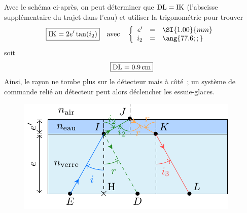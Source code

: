 \documentclass[../../main/main.tex]{subfiles}
\begin{document}
{\begin{enumerate}
		      Avec le schéma ci-après, on peut déterminer que $\rm DL = IK$
		      (l'abscisse supplémentaire du trajet dans l'eau) et utiliser la
		      trigonométrie pour trouver
		      \[
			      \boxed{{\rm IK} = 2e'\tan(i_2)}
			      \quad\text{avec}\quad
			      \left\{
			      \begin{array}{rcl}
				      e'  & = & \SI{1.00}{mm} \\
				      i_2 & = & \ang{77.6;;}
			      \end{array}
			      \right.\]
		      soit
		      \[
			      \boxed{{\rm DL} = \SI{0.9}{cm}}
		      \]
		      Ainsi, le rayon ne tombe plus sur le détecteur mais à côté~; un système
		      de commande relié au détecteur peut alors déclencher les essuie-glaces.
	\end{enumerate}
	\begin{figure}[h]
		\centering
		\includegraphics[width=\linewidth]{pluie.pdf}
		\label{fig:pluie_plain}
	\end{figure}
}
\end{document}
